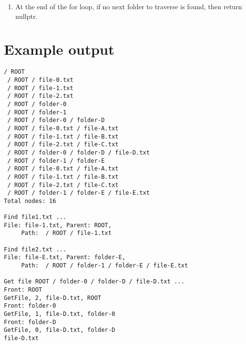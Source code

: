 \documentclass[a4paper,12pt,oneside]{book}
\begin{document}
\begin{enumerate}
    \item   At the end of the for loop, if no next folder to traverse is found, then return nullptr.
\end{enumerate}

    \section{Example output}

    \begin{lstlisting}[style=output]
 / ROOT
 / ROOT / file-0.txt
 / ROOT / file-1.txt
 / ROOT / file-2.txt
 / ROOT / folder-0
 / ROOT / folder-1
 / ROOT / folder-0 / folder-D
 / ROOT / file-0.txt / file-A.txt
 / ROOT / file-1.txt / file-B.txt
 / ROOT / file-2.txt / file-C.txt
 / ROOT / folder-0 / folder-D / file-D.txt
 / ROOT / folder-1 / folder-E
 / ROOT / file-0.txt / file-A.txt
 / ROOT / file-1.txt / file-B.txt
 / ROOT / file-2.txt / file-C.txt
 / ROOT / folder-1 / folder-E / file-E.txt
Total nodes: 16

Find file1.txt ...
File: file-1.txt, Parent: ROOT, 
	 Path:  / ROOT / file-1.txt

Find file2.txt ...
File: file-E.txt, Parent: folder-E, 
	 Path:  / ROOT / folder-1 / folder-E / file-E.txt

Get file ROOT / folder-0 / folder-D / file-D.txt ...
Front: ROOT
GetFile, 2, file-D.txt, ROOT
Front: folder-0
GetFile, 1, file-D.txt, folder-0
Front: folder-D
GetFile, 0, file-D.txt, folder-D
file-D.txt
    \end{lstlisting}
\end{document}
